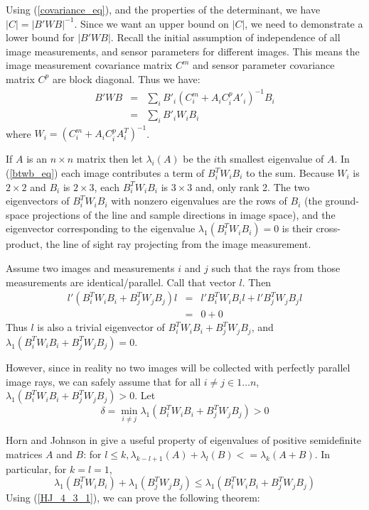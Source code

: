 \documentclass[10pt]{amsart}
\newcommand{\btwbi}{B^T_iW_iB_i}
\newcommand{\btwbj}{B^T_jW_jB_j}
\begin{document}
Using (\ref{covariance_eq}), and the properties of the determinant, we have $|C|
= |B'WB|^{-1}$. Since we want an upper bound on $|C|$, we need to demonstrate a
lower bound for $|B'WB|$. Recall the initial assumption of independence of all
image measurements, and sensor parameters for different images.  This means the image
measurement covariance matrix $C^m$ and sensor parameter covariance matrix $C^p$
are block diagonal. Thus we have:
\begin{eqnarray}\label{btwb_eq}
B'WB & = & \sum_{i}B'_i(C^m_i + A_iC^p_iA'_i)^{-1}B_i \nonumber \\
     & = & \sum_{i}B'_iW_iB_i
\end{eqnarray}
%
where $W_i = (C^m_i + A_iC^p_iA^T_i)^{-1}$.

If $A$ is an $n\times n$ matrix then let $\lambda_i(A)$ be the $i$th smallest
eigenvalue of $A$.  In (\ref{btwb_eq}) each image contributes a term of $\btwbi$
to the sum. Because $W_i$ is $2\times 2$ and $B_i$ is $2\times 3$, each $\btwbi$
is $3\times 3$ and, only rank 2. The two eigenvectors of $\btwbi$ with nonzero
eigenvalues are the rows of $B_i$ (the ground-space projections of the line and
sample directions in image space), and the eigenvector corresponding to the
eigenvalue $\lambda_1(\btwbi)=0$ is their cross-product, the line of sight ray
projecting from the image measurement.

Assume two images and measurements $i$ and $j$ such that the rays from those
measurements are identical/parallel. Call that vector $l$. Then
%
\begin{eqnarray*}
l'(\btwbi+\btwbj)l & = & l'\btwbi l + l'\btwbj l \\
                   & = & 0 + 0
\end{eqnarray*}
Thus $l$ is also a trivial eigenvector of $\btwbi+\btwbj$, and $\lambda_1(\btwbi+\btwbj)=0$.

However, since in reality no two images will be collected with perfectly
parallel image rays, we can safely assume that for all $i\ne j\in 1\ldots n$,
$\lambda_1(\btwbi+\btwbj)>0$. Let 
\begin{equation}\label{w_assumption_eq}
\delta = \min_{i\ne j}\lambda_1(\btwbi+\btwbj) > 0
\end{equation}

Horn and Johnson in \cite{H_AND_J} give a useful property of eigenvalues of positive semidefinite
matrices $A$ and $B$: for $l\le k,
\lambda_{k-l+1}(A)+\lambda_l(B)<=\lambda_k(A+B)$.
In particular, for $k=l=1$,
\begin{equation}\label{HJ_4_3_1}
\lambda_1(\btwbi)+\lambda_1(\btwbj) \le \lambda_1(\btwbi+\btwbj)
\end{equation}
%
Using (\ref{HJ_4_3_1}), we can prove the following theorem:
\end{document}

